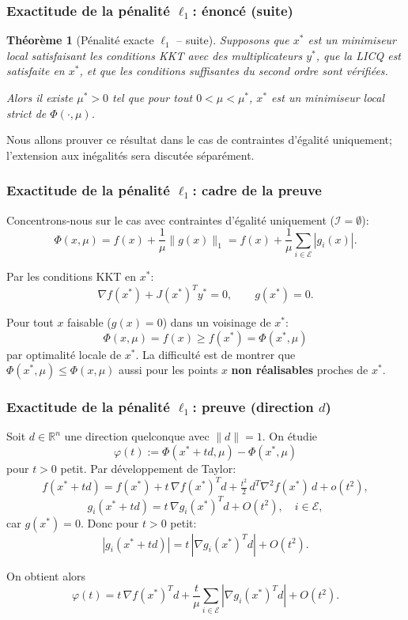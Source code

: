 \documentclass[t,usepdftitle=false,aspectratio=169]{beamer}
\newtheorem{thm}{Théorème}
\def\cE{\mathcal{E}}
\def\cI{\mathcal{I}}
\def\RR{\mathbb{R}}
\begin{document}
\begin{frame}
\frametitle{Exactitude de la pénalité $\ell_1$: énoncé (suite)}

\begin{thm}[Pénalité exacte $\ell_1$ -- suite]
Supposons que $x^*$ est un minimiseur local satisfaisant les conditions KKT avec des multiplicateurs $y^*$, que la LICQ est satisfaite en $x^*$, et que les conditions suffisantes du second ordre sont vérifiées.

\mbox{}

Alors il existe $\mu^* > 0$ tel que pour tout $0 < \mu < \mu^*$, $x^*$ est un minimiseur local strict de $\Phi(\cdot, \mu)$.
\end{thm}

\mbox{}

Nous allons prouver ce résultat dans le cas de contraintes d'égalité uniquement; l'extension aux inégalités sera discutée séparément.

\end{frame}

\begin{frame}
\frametitle{Exactitude de la pénalité $\ell_1$: cadre de la preuve}

Concentrons-nous sur le cas avec contraintes d'égalité uniquement ($\cI = \emptyset$):
$$
\Phi(x, \mu) = f(x) + \frac{1}{\mu} \| g(x) \|_1 = f(x) + \frac{1}{\mu} \sum_{i \in \cE} |g_i(x)|.
$$

\mbox{}

Par les conditions KKT en $x^*$:
$$
\nabla f(x^*) + J(x^*)^T y^* = 0, \qquad g(x^*) = 0.
$$

\mbox{}

Pour tout $x$ faisable ($g(x) = 0$) dans un voisinage de $x^*$:
$$
\Phi(x, \mu) = f(x) \geq f(x^*) = \Phi(x^*, \mu)
$$
par optimalité locale de $x^*$. La difficulté est de montrer que $\Phi(x^*,\mu) \leq \Phi(x,\mu)$ aussi pour les points $x$ \textbf{non réalisables} proches de $x^*$.

\end{frame}

\begin{frame}
\frametitle{Exactitude de la pénalité $\ell_1$: preuve (direction $d$)}

Soit $d \in \RR^n$ une direction quelconque avec $\| d \| = 1$. On étudie
$$
\varphi(t) := \Phi(x^* + td, \mu) - \Phi(x^*, \mu)
$$
pour $t > 0$ petit. Par développement de Taylor:
$$
f(x^*+td) = f(x^*) + t\,\nabla f(x^*)^T d + \tfrac{t^2}{2}\,d^T\nabla^2 f(x^*)\,d + o(t^2),
$$
$$
g_i(x^*+td) = t\,\nabla g_i(x^*)^T d + O(t^2), \quad i \in \cE,
$$
car $g(x^*) = 0$. Donc pour $t > 0$ petit:
$$
|g_i(x^*+td)| = t\,|\nabla g_i(x^*)^T d| + O(t^2).
$$

\mbox{}

On obtient alors
$$
\varphi(t) = t\,\nabla f(x^*)^Td + \frac{t}{\mu}\sum_{i \in \cE} |\nabla g_i(x^*)^Td| + O(t^2).
$$

\end{frame}
\end{document}
